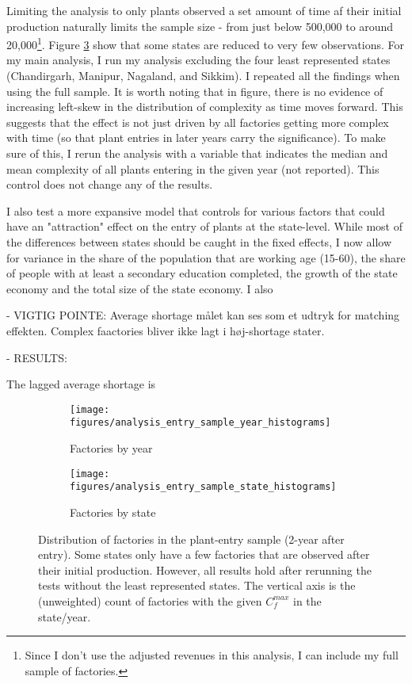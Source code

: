 \documentclass[11pt]{article}
\begin{document}
Limiting the analysis to only plants observed a set amount of time af their initial production naturally limits the sample size - from just below 500,000 to around 20,000\footnote{Since I don't use the adjusted revenues in this analysis, I can include my full sample of factories.}. Figure \ref{fig:new_entry_sample} show that some states are reduced to very few observations. For my main analysis, I run my analysis excluding the four least represented states (Chandirgarh, Manipur, Nagaland, and Sikkim). I  repeated all the findings when using the full sample. It is worth noting that in figure, there is no evidence of increasing left-skew in the distribution of complexity as time moves forward. This suggests that the effect is not just driven by all factories getting more complex with time (so that plant entries in later years carry the significance). To make sure of this, I rerun the analysis with a variable that indicates the median and mean complexity of all plants entering in the given year (not reported). This control does not change any of the results.

I also test a more expansive model that controls for various factors that could have an "attraction" effect on the entry of plants at the state-level. While most of the differences between states should be caught in the fixed effects, I now allow for variance in the share of the population that are working age (15-60), the share of people with at least a secondary education completed, the growth of the state economy and the total size of the state economy. I also  

- VIGTIG POINTE: Average shortage målet kan ses som et udtryk for matching effekten. Complex faactories bliver ikke lagt i høj-shortage stater.



- RESULTS:

The lagged average shortage is 

\begin{figure}
     \centering
     \begin{subfigure}[b]{0.45\textwidth}
         \centering
         \texttt{[image: figures/analysis\_entry\_sample\_year\_histograms]}
	 \caption{Factories by year}
         \label{fig:entry_by_year}
     \end{subfigure}
     \hfill
     \begin{subfigure}[b]{0.45\textwidth}
         \centering
         \texttt{[image: figures/analysis\_entry\_sample\_state\_histograms]}
	 \caption{Factories by state}
         \label{fig:entry_by_state}
     \end{subfigure}
     \caption{Distribution of factories in the plant-entry sample (2-year after entry). Some states only have a few factories that are observed after their initial production. However, all results hold after rerunning the tests without the least represented states. The vertical axis is the (unweighted) count of factories with the given $C^{max}_{f}$ in the state/year.}
        \label{fig:new_entry_sample}
\end{figure}
\end{document}
